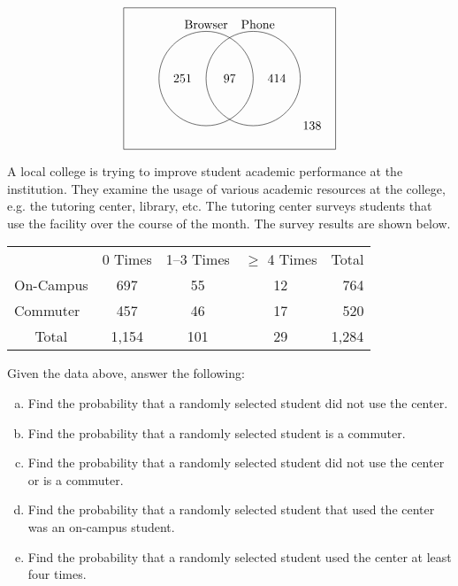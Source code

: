 \documentclass[11pt,letterpaper]{article}
\begin{document}
	\[
	\begin{tikzpicture}[scale=0.67]
	\draw (0,0) rectangle (9,6);
	\draw (3.5,3) circle (2);
	\draw (5.5,3) circle (2);
	
	\node at (3.5,5.3) {Browser};
	\node at (5.7,5.3) {Phone}; 
	
	\node at (2.5,3) {251};
	\node at (4.5,3) {97};
	\node at (6.5,3) {414};
	\node at (8,1) {138};
	\end{tikzpicture}
	\]



\newpage



 A local college is trying to improve student academic performance at the institution. They examine the usage of various academic resources at the college, e.g. the tutoring center, library, etc. The tutoring center surveys students that use the facility over the course of the month. The survey results are shown below. \par
	\begin{table}[H]
	\centering
	\begin{tabular}{lcccc}
	 & 0 Times & 1--3 Times & $\geq$ 4 Times & Total \\ \cline{2-4}
	\multicolumn{1}{l|}{On-Campus} & \multicolumn{1}{c|}{697} & \multicolumn{1}{c|}{55} & \multicolumn{1}{c|}{12} & \multicolumn{1}{r}{764} \\
	\multicolumn{1}{l|}{Commuter} & \multicolumn{1}{c|}{457} & \multicolumn{1}{c|}{46} & \multicolumn{1}{c|}{17} & \multicolumn{1}{r}{520} \\ \cline{2-4}
	\multicolumn{1}{c}{Total} & 1,154 & 101 & 29 & 1,284
	\end{tabular}
	\end{table} \par
	
Given the data above, answer the following:
	\begin{enumerate}[(a)]
	\item Find the probability that a randomly selected student did not use the center.
	\item Find the probability that a randomly selected student is a commuter. 
	\item Find the probability that a randomly selected student did not use the center or is a commuter. 
	\item Find the probability that a randomly selected student that used the center was an on-campus student.
	\item Find the probability that a randomly selected student used the center at least four times. 
	\end{enumerate} \pspace
\end{document}
